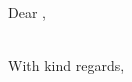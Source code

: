 \documentclass[10pt]{letter}
\begin{document}
\begin{letter}{\receivername \\ \receiveraddressline \\ \receivercity}

\opening{\textbf{}}

Dear \receivername,

\content
~\\
\newline\newline\newline\newline
With kind regards,
\newline\newline\newline\newline
\sendername


\end{letter}
\end{document}
